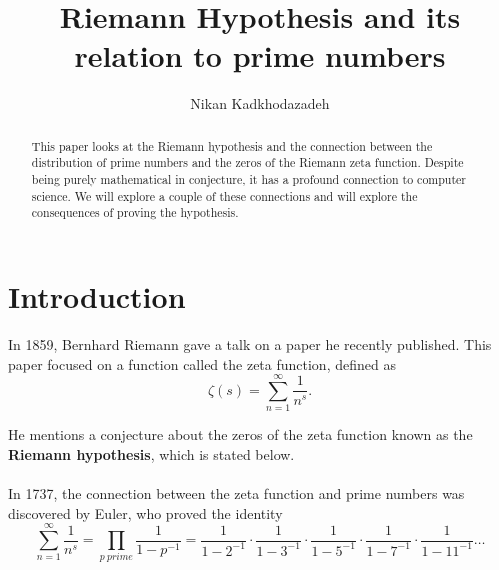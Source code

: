 \documentclass[12pt]{amsart} %
\theoremstyle{definition}
\theoremstyle{remark}
\numberwithin{equation}{section}
\begin{document}
\title{Riemann Hypothesis and its relation to prime numbers}

\author{Nikan Kadkhodazadeh}
\address{Department of Computer Science, University of Southern Maine, 
Portland, ME}

\begin{abstract}
This paper looks at the Riemann hypothesis and the connection between the distribution of prime numbers and the zeros of the Riemann zeta function. Despite being purely mathematical in conjecture, it has a profound connection to computer science. We will explore a couple of these connections and will explore the consequences of proving the hypothesis.
\end{abstract}

\maketitle
\tableofcontents

\section{Introduction}
In 1859, Bernhard Riemann gave a talk on a paper he recently published. This paper focused on a function called the zeta function, defined as
$$\zeta(s) = \sum_{n=1}^\infty \frac{1}{n^s}.$$

He mentions a conjecture about the zeros of the zeta function known as the \textbf{Riemann hypothesis}, which is stated below.
\\

\noindent{}
\\

In 1737, the connection between the zeta function and prime numbers was discovered by Euler, who proved the identity 
$$\sum_{n=1}^\infty \frac{1}{n^s} = 
  \prod_{p \ prime} \frac{1}{1-p^{-1}} = \frac{1}{1-2^{-1}}
 \cdot \frac{1}{1-3^{-1}} \cdot \frac{1}{1-5^{-1}} \cdot \frac{1}{1-7^{-1}} \cdot \frac{1}{1-11^{-1}} \ldots$$
 \newpage
\end{document}

